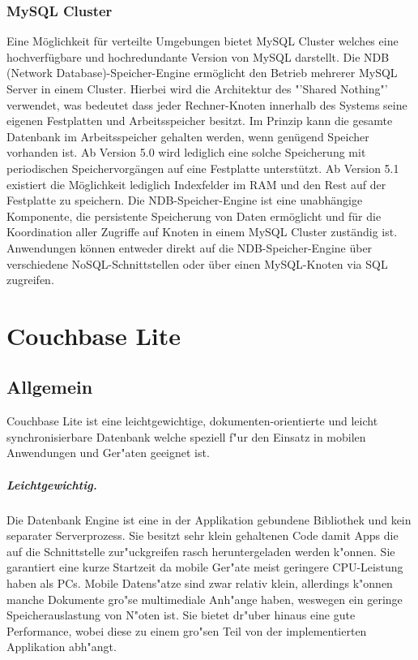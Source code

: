 \documentclass[a4paper,14pt]{scrreprt}
\begin{document}
\subsection{MySQL Cluster}
Eine Möglichkeit für verteilte Umgebungen bietet MySQL Cluster welches eine hochverfügbare und hochredundante Version von MySQL darstellt. Die NDB (Network Database)-Speicher-Engine ermöglicht den Betrieb mehrerer MySQL Server in einem Cluster. Hierbei wird die Architektur des "'Shared Nothing"' verwendet, was bedeutet dass jeder Rechner-Knoten innerhalb des Systems seine eigenen Festplatten und Arbeitsspeicher besitzt. Im Prinzip kann die gesamte Datenbank im Arbeitsspeicher gehalten werden, wenn genügend Speicher vorhanden ist. Ab Version 5.0 wird lediglich eine solche Speicherung mit periodischen Speichervorgängen auf eine Festplatte unterstützt. Ab Version 5.1 existiert die Möglichkeit lediglich Indexfelder im RAM und den Rest auf der Festplatte zu speichern. Die NDB-Speicher-Engine ist eine unabhängige Komponente, die persistente Speicherung von Daten ermöglicht und für die Koordination aller Zugriffe auf Knoten in einem MySQL Cluster zuständig ist. Anwendungen können entweder direkt auf die NDB-Speicher-Engine über verschiedene NoSQL-Schnittstellen oder über einen MySQL-Knoten via SQL zugreifen.\cite{mys}
\chapter{Couchbase Lite}
\section{Allgemein}
Couchbase Lite ist eine leichtgewichtige, dokumenten-orientierte und leicht synchronisierbare Datenbank welche speziell f"ur den Einsatz in mobilen Anwendungen und Ger"aten geeignet ist.
\paragraph{Leichtgewichtig.}
Die Datenbank Engine ist eine in der Applikation gebundene Bibliothek und kein separater Serverprozess. Sie besitzt sehr klein gehaltenen Code damit Apps die auf die Schnittstelle zur"uckgreifen rasch heruntergeladen werden k"onnen. Sie garantiert eine kurze Startzeit da mobile Ger"ate meist geringere CPU-Leistung haben als PCs. Mobile Datens"atze sind zwar relativ klein, allerdings k"onnen manche Dokumente gro"se multimediale Anh"ange haben, weswegen ein geringe Speicherauslastung von N"oten ist. Sie bietet dr"uber hinaus eine gute Performance, wobei diese zu einem gro"sen Teil von der implementierten Applikation abh"angt.
\end{document}
